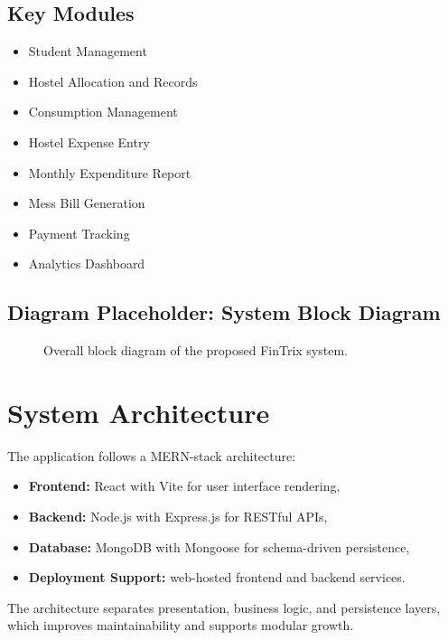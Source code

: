\documentclass[conference]{IEEEtran}
\begin{document}
\subsection{Key Modules}
\begin{itemize}
\item Student Management
\item Hostel Allocation and Records
\item Consumption Management
\item Hostel Expense Entry
\item Monthly Expenditure Report
\item Mess Bill Generation
\item Payment Tracking
\item Analytics Dashboard
\end{itemize}

\subsection{Diagram Placeholder: System Block Diagram}
\begin{figure}[H]
\centering
{}
\caption{Overall block diagram of the proposed FinTrix system.}
\label{fig:block}
\end{figure}

\section{System Architecture}
The application follows a MERN-stack architecture:
\begin{itemize}
\item \textbf{Frontend:} React with Vite for user interface rendering,
\item \textbf{Backend:} Node.js with Express.js for RESTful APIs,
\item \textbf{Database:} MongoDB with Mongoose for schema-driven persistence,
\item \textbf{Deployment Support:} web-hosted frontend and backend services.
\end{itemize}

The architecture separates presentation, business logic, and persistence layers, which improves maintainability and supports modular growth.
\end{document}
